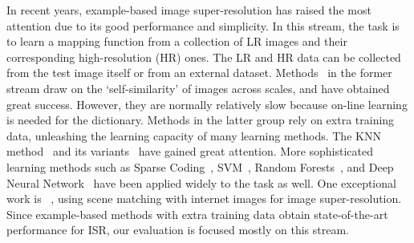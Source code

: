 In recent years, example-based image super-resolution has raised the
most attention due to its good performance and simplicity. In this
stream, the task is to learn a mapping function from a collection of
LR images and their corresponding high-resolution (HR) ones. The LR and HR data can be
collected from the test image itself or from an external dataset.
Methods~\citep{Freedman-TOG-2011, Glasner-ICCV-2009, selfsimaccv, Huang_2015_CVPR}
in the former stream draw on the `self-similarity' of images across scales,
and have obtained great success. However, they are normally relatively slow because on-line learning is needed for the dictionary. 
Methods in the latter group rely on extra training data, unleashing the learning capacity
of many learning methods. The KNN method~\citep{Freeman-CGA-2002}
and its variants~\citep{Chang-CVPR-2004, Yang-ICCV-2013, JOR:EG15, metric:imitation}
have gained great attention. More sophisticated learning methods such as Sparse Coding~\citep{Yang-TIP-2010,  Kim-PAMI-2010, Timofte-ICCV-2013, Timofte-ACCV-2014,  deeply:improved},
SVM~\citep{ISR:SVM}, Random Forests~\citep{SR_forest, NBSRF, cSRF}, and Deep Neural Network~\citep{Dong-ECCV-2014, deep:cascade, deeply:improved} have been applied widely to the task as well.
One exceptional work is ~\citep{ISR:internet}, using scene matching with internet images for image super-resolution.
Since example-based methods with extra training data obtain state-of-the-art performance for ISR, our 
evaluation is focused mostly on this stream.


